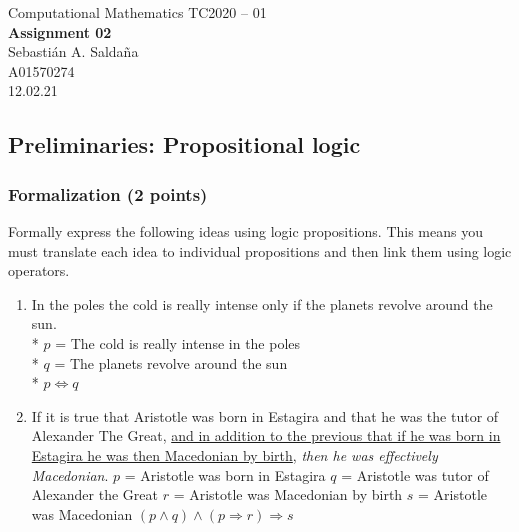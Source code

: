 \documentclass[]{book}
\theoremstyle{definition}
\begin{document}
\begin{center}
{\huge Computational Mathematics TC2020 -- 01}\\[1.5ex]
{\large \textbf{Assignment 02}\\[1.5ex] 
Sebastián A. Saldaña\\
A01570274\\%
12.02.21} %
\end{center}

\vspace{0.2 cm}

\subsection*{Preliminaries: Propositional logic}
\subsubsection*{Formalization (2 points)}
Formally express the following ideas using logic propositions. This means you must translate each idea to individual propositions and then link them using logic operators.
\begin{enumerate}
	\item In the poles the cold is really intense only if the planets revolve around the sun. \\* $p$ = The cold is really intense in the poles \\* $q$ = The planets revolve around the sun \\* $p \Leftrightarrow q$
	\item If it is true that Aristotle was born in Estagira and that he was the tutor of Alexander The Great, \underline{and in addition to the previous that if he was born in Estagira he was then Macedonian by birth}, \emph{then he was effectively Macedonian}. \newline 
	$p$ = Aristotle was born in Estagira \newline 
	$q$ = Aristotle was tutor of Alexander the Great \newline 
	$r$ = Aristotle was Macedonian by birth \newline
	$s$ = Aristotle was Macedonian \newline
	$(p \land q) \land (p \Rightarrow r)  \Rightarrow s$
\end{enumerate}
\end{document}
